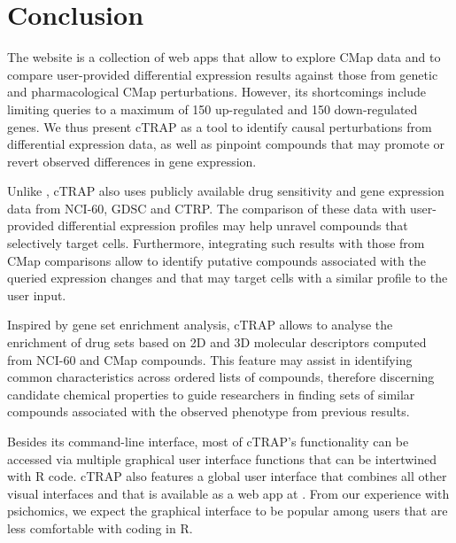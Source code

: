 \section{Conclusion}


The  website is a collection of web apps that allow to explore CMap data and to compare user-provided differential expression results against those from genetic and pharmacological CMap perturbations. However, its shortcomings include limiting queries to a maximum of 150 up-regulated and 150 down-regulated genes. We thus present cTRAP as a tool to identify causal perturbations from differential expression data, as well as pinpoint compounds that may promote or revert observed differences in gene expression.

Unlike , cTRAP also uses publicly available drug sensitivity and gene expression data from NCI-60, GDSC and CTRP. The comparison of these data with user-provided differential expression profiles may help unravel compounds that selectively target cells. Furthermore, integrating such results with those from CMap comparisons allow to identify putative compounds associated with the queried expression changes and that may target cells with a similar profile to the user input.

Inspired by gene set enrichment analysis, cTRAP allows to analyse the enrichment of drug sets based on 2D and 3D molecular descriptors computed from NCI-60 and CMap compounds. This feature may assist in identifying common characteristics across ordered lists of compounds, therefore discerning candidate chemical properties to guide researchers in finding sets of similar compounds associated with the observed phenotype from previous results. %

Besides its command-line interface, most of cTRAP's functionality can be accessed via multiple graphical user interface functions that can be intertwined with R code. cTRAP also features a global user interface that combines all other visual interfaces and that is available as a web app at . From our experience with psichomics, we expect the graphical interface to be popular among users that are less comfortable with coding in R.

